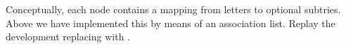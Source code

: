 \begin{isabellebody}
\begin{isamarkuptext}
\begin{exercise}
  Conceptually, each node contains a mapping from letters to optional
  subtries. Above we have implemented this by means of an association
  list. Replay the development replacing 
  with .
\end{exercise}%
\end{isamarkuptext}%
\isamarkuptrue%
\isamarkupfalse%
\isamarkupfalse%
\isamarkupfalse%
\isamarkupfalse%
\isamarkupfalse%
\isamarkupfalse%
\isamarkupfalse%
\isamarkupfalse%
\isamarkupfalse%
\isamarkupfalse%
\isamarkupfalse%
\isamarkupfalse%
\isamarkupfalse%
\isamarkupfalse%
\isamarkupfalse%
\isamarkupfalse%
\isamarkupfalse%
\isamarkupfalse%
\isamarkupfalse%
\isamarkupfalse%
\isamarkupfalse%
\isamarkupfalse%
\isamarkupfalse%
\isamarkupfalse%
\isamarkupfalse%
\isamarkupfalse%
\isamarkupfalse%
\isamarkupfalse%
\isamarkupfalse%
\isamarkupfalse%
\isamarkupfalse%
\isamarkupfalse%
\isamarkupfalse%
\isamarkupfalse%
\isamarkupfalse%
\end{isabellebody}%
